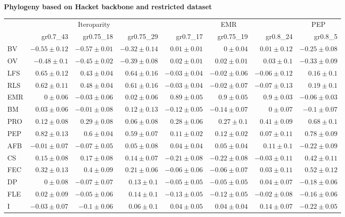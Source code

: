 \begin{landscape}
\begin{table}
\begin{footnotesize}
\textbf{Phylogeny based on Hacket backbone and restricted dataset}

\begin{tabular}{@{}l|rrr|rrr|r@{}}
\toprule
 & \multicolumn{3}{c|}{Iteroparity} & \multicolumn{3}{c|}{EMR} & \multicolumn{1}{c}{PEP}\\
 & gr0.7\_43 & gr0.75\_18 & gr0.75\_29 & gr0.7\_17 & gr0.75\_19 & gr0.8\_24 & gr0.8\_5\\
\midrule
BV & $-0.55 \pm 0.12$ & $-0.57 \pm 0.01$ & $-0.32 \pm 0.14$ & $0.01 \pm 0.01$ & $0 \pm 0.04$ & $0.01 \pm 0.12$ & $-0.25 \pm 0.08$\\
OV & $-0.48 \pm 0.1$ & $-0.45 \pm 0.02$ & $-0.39 \pm 0.08$ & $0.02 \pm 0.01$ & $0.02 \pm 0.01$ & $0.03 \pm 0.1$ & $-0.33 \pm 0.09$\\
LFS & $0.65 \pm 0.12$ & $0.43 \pm 0.04$ & $0.64 \pm 0.16$ & $-0.03 \pm 0.04$ & $-0.02 \pm 0.06$ & $-0.06 \pm 0.12$ & $0.16 \pm 0.1$\\
RLS & $0.62 \pm 0.11$ & $0.48 \pm 0.04$ & $0.61 \pm 0.16$ & $-0.03 \pm 0.04$ & $-0.02 \pm 0.07$ & $-0.07 \pm 0.13$ & $0.19 \pm 0.1$\\
EMR & $0 \pm 0.06$ & $-0.03 \pm 0.06$ & $0.02 \pm 0.06$ & $0.89 \pm 0.05$ & $0.9 \pm 0.05$ & $0.9 \pm 0.03$ & $-0.06 \pm 0.03$\\
BM & $0.03 \pm 0.06$ & $-0.01 \pm 0.08$ & $0.12 \pm 0.13$ & $-0.12 \pm 0.05$ & $-0.14 \pm 0.07$ & $0 \pm 0.07$ & $-0.1 \pm 0.07$\\
PRO & $0.12 \pm 0.08$ & $0.29 \pm 0.08$ & $0.06 \pm 0.08$ & $0.28 \pm 0.06$ & $0.27 \pm 0.1$ & $0.41 \pm 0.09$ & $0.68 \pm 0.1$\\
PEP & $0.82 \pm 0.13$ & $0.6 \pm 0.04$ & $0.59 \pm 0.07$ & $0.11 \pm 0.02$ & $0.12 \pm 0.02$ & $0.07 \pm 0.11$ & $0.78 \pm 0.09$\\
AFB & $-0.01 \pm 0.07$ & $-0.07 \pm 0.05$ & $0.05 \pm 0.08$ & $0.04 \pm 0.04$ & $0.05 \pm 0.04$ & $0.11 \pm 0.1$ & $-0.22 \pm 0.09$\\
CS & $0.15 \pm 0.08$ & $0.17 \pm 0.08$ & $0.14 \pm 0.07$ & $-0.21 \pm 0.08$ & $-0.22 \pm 0.08$ & $-0.03 \pm 0.11$ & $0.42 \pm 0.11$\\
FEC & $0.32 \pm 0.13$ & $0.4 \pm 0.09$ & $0.21 \pm 0.06$ & $-0.06 \pm 0.06$ & $-0.06 \pm 0.07$ & $0.03 \pm 0.11$ & $0.52 \pm 0.12$\\
DP & $0 \pm 0.08$ & $-0.07 \pm 0.07$ & $0.13 \pm 0.1$ & $-0.05 \pm 0.05$ & $-0.05 \pm 0.05$ & $0.04 \pm 0.07$ & $-0.18 \pm 0.06$\\
FLE & $0.02 \pm 0.09$ & $-0.05 \pm 0.06$ & $0.14 \pm 0.1$ & $-0.13 \pm 0.05$ & $-0.12 \pm 0.05$ & $-0.02 \pm 0.08$ & $-0.16 \pm 0.06$\\
I & $-0.03 \pm 0.07$ & $-0.1 \pm 0.06$ & $0.06 \pm 0.1$ & $0.04 \pm 0.05$ & $0.04 \pm 0.04$ & $0.14 \pm 0.07$ & $-0.22 \pm 0.05$\\
\bottomrule
\end{tabular}

\end{footnotesize}
\end{table}
\end{landscape}%


